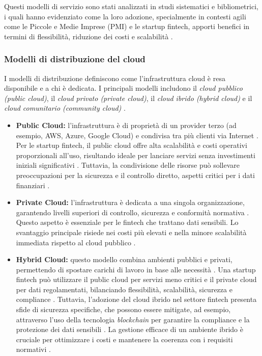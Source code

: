 Questi modelli di servizio sono stati analizzati in studi sistematici e bibliometrici, i quali hanno evidenziato come la loro adozione, specialmente in contesti agili come le Piccole e Medie Imprese (PMI) e le startup fintech, apporti benefici in termini di flessibilità, riduzione dei costi e scalabilità \cite{vats2024systematic, hrmars2025cloud}.

\subsubsection{Modelli di distribuzione del cloud}

I modelli di distribuzione definiscono come l'infrastruttura cloud è resa disponibile e a chi è dedicata. I principali modelli includono il \textit{cloud pubblico (public cloud)}, il \textit{cloud privato (private cloud)}, il \textit{cloud ibrido (hybrid cloud)} e il \textit{cloud comunitario (community cloud)} \cite{maticmind2024hybrid, iso2018overview}.

\begin{itemize}
    \item \textbf{Public Cloud:} l'infrastruttura è di proprietà di un provider terzo (ad esempio, AWS, Azure, Google Cloud) e condivisa tra più clienti via Internet \cite{maticmind2024hybrid}. Per le startup fintech, il public cloud offre alta scalabilità e costi operativi proporzionali all'uso, risultando ideale per lanciare servizi senza investimenti iniziali significativi \cite{maticmind2024hybrid}. Tuttavia, la condivisione delle risorse può sollevare preoccupazioni per la sicurezza e il controllo diretto, aspetti critici per i dati finanziari \cite{vats2024systematic, maticmind2024hybrid}.
    
    \item \textbf{Private Cloud:} l'infrastruttura è dedicata a una singola organizzazione, garantendo livelli superiori di controllo, sicurezza e conformità normativa \cite{maticmind2024hybrid}. Questo aspetto è essenziale per le fintech che trattano dati sensibili. Lo svantaggio principale risiede nei costi più elevati e nella minore scalabilità immediata rispetto al cloud pubblico \cite{maticmind2024hybrid}.
    
    \item \textbf{Hybrid Cloud:} questo modello combina ambienti pubblici e privati, permettendo di spostare carichi di lavoro in base alle necessità \cite{maticmind2024hybrid}. Una startup fintech può utilizzare il public cloud per servizi meno critici e il private cloud per dati regolamentati, bilanciando flessibilità, scalabilità, sicurezza e compliance \cite{maticmind2024hybrid}. Tuttavia, l'adozione del cloud ibrido nel settore fintech presenta sfide di sicurezza specifiche, che possono essere mitigate, ad esempio, attraverso l'uso della tecnologia \textit{blockchain} per garantire la compliance e la protezione dei dati sensibili \cite{urf2024security, vats2024systematic}. La gestione efficace di un ambiente ibrido è cruciale per ottimizzare i costi e mantenere la coerenza con i requisiti normativi \cite{maticmind2024hybrid}.
\end{itemize}

